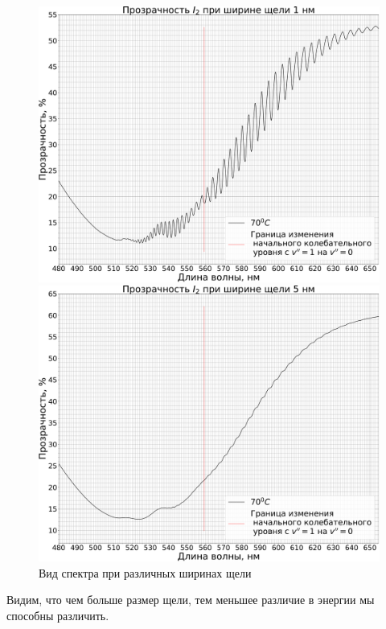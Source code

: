 \begin{figure}[H]
\begin{minipage}[h!]{0.5\linewidth}
	\end{minipage}
	\begin{minipage}[h!]{0.5\linewidth}
		\centering
		\includegraphics[width=1\linewidth]{data/absorption_spectrum_slit_1}
	\end{minipage}
	\begin{minipage}[h!]{0.5\linewidth}
		\centering
		\includegraphics[width=1\linewidth]{data/absorption_spectrum_slit_5}
	\end{minipage}
	\caption{Вид спектра при различных ширинах щели}
	\label{fig:absorption_spectrum_slit}
\end{figure}
Видим, что чем больше размер щели, тем меньшее различие в энергии мы способны различить.

